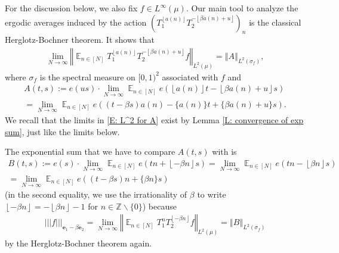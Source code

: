 \documentclass[11pt]{amsart}
\theoremstyle{definition}
\DeclareMathOperator*{\E}{\mathbb{E}}
\newcommand{\Q}{{\mathbb Q}}
\newcommand{\Z}{{\mathbb Z}}
\newcommand{\be}{{\mathbf{e}}}
\newcommand{\norm}[1]{\left\Vert #1\right\Vert}
\newcommand{\nnorm}[1]{\lvert\!|\!| #1|\!|\!\rvert}
\newcommand{\1}{{\mathbf{1}}}
\newcommand{\floor}[1]{{\left \lfloor #1 \right \rfloor}}
\begin{document}
For the discussion below, we also fix $f\in L^\infty(\mu)$.
Our main tool to analyze the ergodic averages induced by the action $(T_1^{\floor{ a(n)}}T_2^{-\floor{\beta a(n)+u}})_n$ is the classical Herglotz-Bochner theorem. It shows that
\begin{align}\label{E: L^2 for A}
    \lim_{N\to\infty}\norm{\E_{n\in[N]} T_1^{\floor{ a(n)}}T_2^{-\floor{\beta a(n)+u}} f}_{L^2(\mu)} %
    = \norm{A}_{L^2(\sigma_f)},
\end{align}
where $\sigma_f$ is the spectral measure on $[0,1)^2$ associated with $f$ and
\begin{multline*}
    A(t,s):= e(us)\cdot \lim_{N\to\infty}\E_{n\in[N]} e(\floor{ a(n)}t -\floor{\beta a(n)+u}s)\\
    =  \lim_{N\to\infty}\E_{n\in[N]} e((t - \beta s) a(n)- \{ a(n)\}t +\{\beta a(n)+u\}s).
\end{multline*}
We recall that the limits in \eqref{E: L^2 for A} exist by Lemma \ref{L: convergence of exp sum}, just like the limits below.

The exponential sum that we have to compare $A(t,s)$ with %
 is
\begin{multline*}
    B(t,s):= e(s) \cdot \lim_{N\to\infty}\E_{n\in[N]} e(t n +\floor{-\beta n}s) = \lim_{N\to\infty}\E_{n\in[N]} e(t n -\floor{\beta n}s)\\
    =  \lim_{N\to\infty}\E_{n\in[N]} e((t - \beta s) n+\{\beta n\}s)
\end{multline*}
(in the second equality, we use the irrationality of $\beta$ to write $\floor{-\beta n} = -\floor{\beta n} - 1$ for $n\in\Z\backslash\{0\}$)
 because 
\begin{align}\label{E: L^2 for B}
    \nnorm{f}_{\be_1 - \beta \be_2} = \lim_{N\to\infty}\norm{\E_{n\in[N]} T_1^n T_2^{\floor{-\beta n}} f}_{L^2(\mu)} 
    = \norm{B}_{L^2(\sigma_f)}
\end{align}
by the Herglotz-Bochner theorem again.
\end{document}
